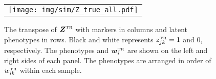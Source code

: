 \documentclass[12pt,]{article}
\newcommand{\true}{{\mbox{\tiny TR}}}
\newcommand{\bZ}{\mbox{\boldmath $Z$}}
\newcommand{\bw}{\mbox{\boldmath $w$}}
\begin{document}
\begin{figure}[t!]
  \begin{center}
\begin{tabular}{c}
\texttt{[image: img/sim/Z\_true\_all.pdf]}
  \end{tabular}
 \end{center}
 \vspace{-0.05in}
\caption{The transpose of $\bZ^\true$ with markers in columns and latent
phenotypes in rows. Black and white represents $z^\true_{jk}=1$ and 0,
respectively. The phenotypes and $\bw^\true_i$ are shown on the left and
right sides of each panel.  The phenotypes are arranged in order of
$w_{ik}^\true$ within each sample.}
\label{fig:sim-Z}
\end{figure}
\end{document}
